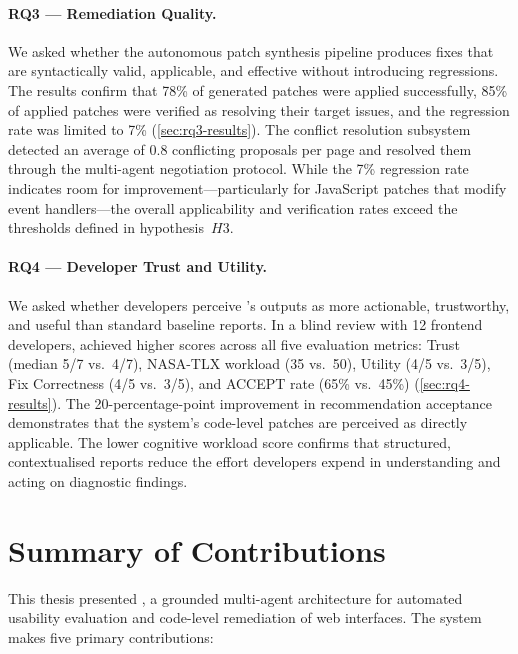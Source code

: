 \paragraph{RQ3 --- Remediation Quality.}
We asked whether the autonomous patch synthesis pipeline produces fixes that are syntactically valid, applicable, and effective without introducing regressions. The results confirm that 78\% of generated patches were applied successfully, 85\% of applied patches were verified as resolving their target issues, and the regression rate was limited to 7\% (\cref{sec:rq3-results}). The conflict resolution subsystem detected an average of 0.8 conflicting proposals per page and resolved them through the multi-agent negotiation protocol. While the 7\% regression rate indicates room for improvement---particularly for JavaScript patches that modify event handlers---the overall applicability and verification rates exceed the thresholds defined in hypothesis~$H3$.

\paragraph{RQ4 --- Developer Trust and Utility.}
We asked whether developers perceive \versimux{}'s outputs as more actionable, trustworthy, and useful than standard baseline reports. In a blind review with 12 frontend developers, \versimux{} achieved higher scores across all five evaluation metrics: Trust (median 5/7 vs.\ 4/7), NASA-TLX workload (35 vs.\ 50), Utility (4/5 vs.\ 3/5), Fix Correctness (4/5 vs.\ 3/5), and ACCEPT rate (65\% vs.\ 45\%) (\cref{sec:rq4-results}). The 20-percentage-point improvement in recommendation acceptance demonstrates that the system's code-level patches are perceived as directly applicable. The lower cognitive workload score confirms that structured, contextualised reports reduce the effort developers expend in understanding and acting on diagnostic findings.


\section{Summary of Contributions}
\label{sec:summary}

This thesis presented \versimux{}, a grounded multi-agent architecture for automated usability evaluation and code-level remediation of web interfaces. The system makes five primary contributions:

